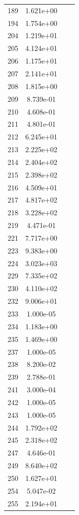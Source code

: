 \documentclass[12pt]{article}
\begin{document}
\begin{longtable}{@{}cccc@{}}
189 & 1.621e+00 &  &  \\
194 & 1.754e+00 &  &  \\
204 & 1.219e+01 &  &  \\
205 & 4.124e+01 &  &  \\
206 & 1.175e+01 &  &  \\
207 & 2.141e+01 &  &  \\
208 & 1.815e+00 &  &  \\
209 & 8.739e-01 &  &  \\
210 & 4.608e-01 &  &  \\
211 & 4.801e-01 &  &  \\
212 & 6.245e+01 &  &  \\
213 & 2.225e+02 &  &  \\
214 & 2.404e+02 &  &  \\
215 & 2.398e+02 &  &  \\
216 & 4.509e+01 &  &  \\
217 & 4.817e+02 &  &  \\
218 & 3.228e+02 &  &  \\
219 & 4.471e-01 &  &  \\
221 & 7.717e+00 &  &  \\
223 & 9.383e+00 &  &  \\
224 & 3.023e+03 &  &  \\
229 & 7.335e+02 &  &  \\
230 & 4.110e+02 &  &  \\
232 & 9.006e+01 &  &  \\
233 & 1.000e-05 &  &  \\
234 & 1.183e+00 &  &  \\
235 & 1.469e+00 &  &  \\
237 & 1.000e-05 &  &  \\
238 & 8.200e-02 &  &  \\
239 & 2.788e-01 &  &  \\
241 & 3.000e-04 &  &  \\
242 & 1.000e-05 &  &  \\
243 & 1.000e-05 &  &  \\
244 & 1.792e+02 &  &  \\
245 & 2.318e+02 &  &  \\
247 & 4.646e-01 &  &  \\
249 & 8.640e+02 &  &  \\
250 & 1.627e+01 &  &  \\
254 & 5.047e-02 &  &  \\
255 & 2.194e+01 &  &  \\

\end{longtable}
\end{document}
